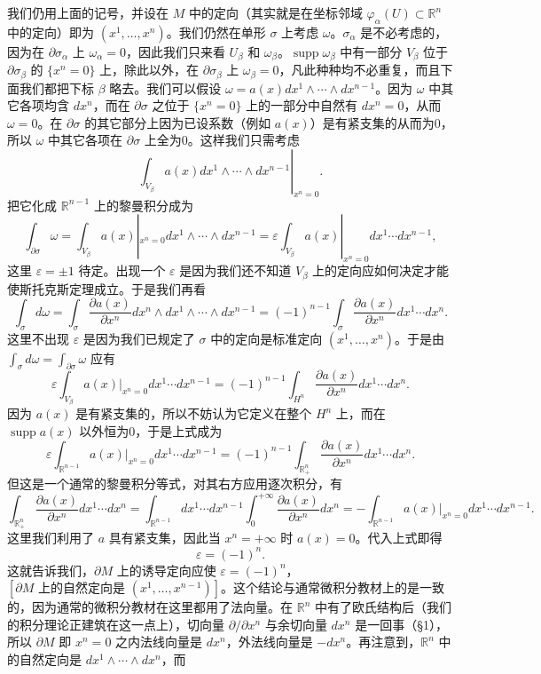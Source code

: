 我们仍用上面的记号，并设在 $M$ 中的定向（其实就是在坐标邻域 $\varphi_\alpha(U)\subset\mathbb R^n$ 中的定向）即为 $(x^1,\ldots,x^n)$。我们仍然在单形 $\sigma$ 上考虑 $\omega$。$\sigma_\alpha$ 是不必考虑的，因为在 $\partial\sigma_\alpha$ 上 $\omega_\alpha=0$，因此我们只来看 $U_\beta$ 和 $\omega_\beta$。$\operatorname{supp}\omega_\beta$ 中有一部分 $V_\beta$ 位于 $\partial\sigma_\beta$ 的 $\{x^n=0\}$ 上，除此以外，在 $\partial\sigma_\beta$ 上 $\omega_\beta=0$，凡此种种均不必重复，而且下面我们都把下标 $\beta$ 略去。我们可以假设 $\omega=a(x)dx^1\wedge\cdots\wedge dx^{n-1}$。因为 $\omega$ 中其它各项均含 $dx^n$，而在 $\partial\sigma$ 之位于 $\{x^n=0\}$ 上的一部分中自然有 $dx^n=0$，从而 $\omega=0$。在 $\partial\sigma$ 的其它部分上因为已设系数（例如 $a(x)$）是有紧支集的从而为0，所以 $\omega$ 中其它各项在 $\partial\sigma$ 上全为0。这样我们只需考虑
\[
 \left.\int_{V_\beta}a(x)dx^1\wedge\cdots\wedge dx^{n-1}\right|_{x^n=0}.
\]
把它化成 $\mathbb R^{n-1}$ 上的黎曼积分成为
\[
 \int_{\partial\sigma}\omega
 =\int_{V_\beta}a(x)|_{x^n=0}dx^1\wedge\cdots\wedge dx^{n-1}
 =\varepsilon\int_{V_\beta}a(x)|_{x^n=0}dx^1\cdots dx^{n-1},
\]
这里 $\varepsilon=\pm1$ 待定。出现一个 $\varepsilon$ 是因为我们还不知道 $V_\beta$ 上的定向应如何决定才能使斯托克斯定理成立。于是我们再看
\[
 \int_\sigma d\omega
 =\int_\sigma \frac{\partial a(x)}{\partial x^n}dx^n\wedge dx^1\wedge\cdots\wedge dx^{n-1}
 =(-1)^{n-1}\int_\sigma\frac{\partial a(x)}{\partial x^n}dx^1\cdots dx^n.
\]
这里不出现 $\varepsilon$ 是因为我们已规定了 $\sigma$ 中的定向是标准定向 $(x^1,\ldots,x^n)$。于是由 $\int_\sigma d\omega=\int_{\partial\sigma}\omega$ 应有
\[
 \varepsilon\int_{V_\beta}a(x)|_{x^n=0}dx^1\cdots dx^{n-1}
 =(-1)^{n-1}\int_{H^n}\frac{\partial a(x)}{\partial x^n}dx^1\cdots dx^n.
\]
因为 $a(x)$ 是有紧支集的，所以不妨认为它定义在整个 $H^n$ 上，而在 $\operatorname{supp}a(x)$ 以外恒为0，于是上式成为
\[
 \varepsilon\int_{\mathbb R^{n-1}}a(x)|_{x^n=0}dx^1\cdots dx^{n-1}
 =(-1)^{n-1}\int_{\mathbb R^n_+}\frac{\partial a(x)}{\partial x^n}dx^1\cdots dx^n.
\]
但这是一个通常的黎曼积分等式，对其右方应用逐次积分，有
\[
 \int_{\mathbb R^n_+}\frac{\partial a(x)}{\partial x^n}dx^1\cdots dx^n
 =\int_{\mathbb R^{n-1}}dx^1\cdots dx^{n-1}\int_0^{+\infty}\frac{\partial a(x)}{\partial x^n}dx^n
 =-\int_{\mathbb R^{n-1}}a(x)|_{x^n=0}dx^1\cdots dx^{n-1}.
\]
这里我们利用了 $a$ 具有紧支集，因此当 $x^n=+\infty$ 时 $a(x)=0$。代入上式即得
\begin{equation}
 \varepsilon=(-1)^n.
 \tag{28}
\end{equation}
这就告诉我们，$\partial M$ 上的诱导定向应使 $\varepsilon=(-1)^n$，$[\partial M\text{ 上的自然定向是 }(x^1,\ldots,x^{n-1})]$。这个结论与通常微积分教材上的是一致的，因为通常的微积分教材在这里都用了法向量。在 $\mathbb R^n$ 中有了欧氏结构后（我们的积分理论正建筑在这一点上），切向量 $\partial/\partial x^n$ 与余切向量 $dx^n$ 是一回事（§1），所以 $\partial M$ 即 $x^n=0$ 之内法线向量是 $dx^n$，外法线向量是 $-dx^n$。再注意到，$\mathbb R^n$ 中的自然定向是 $dx^1\wedge\cdots\wedge dx^n$，而
